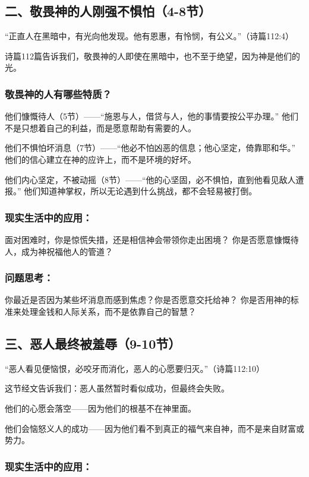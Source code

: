 \documentclass[a4paper, 12pt]{article}
\begin{document}
\subsection*{二、敬畏神的人刚强不惧怕（4-8节）}
“正直人在黑暗中，有光向他发现。他有恩惠，有怜悯，有公义。”（诗篇112:4）

诗篇112篇告诉我们，敬畏神的人即使在黑暗中，也不至于绝望，因为神是他们的光。

\subsubsection*{敬畏神的人有哪些特质？}

\hspace{0.6cm}他们慷慨待人（5节）——“施恩与人，借贷与人，他的事情要按公平办理。”
他们不是只想着自己的利益，而是愿意帮助有需要的人。

他们不惧怕坏消息（7节）——“他必不怕凶恶的信息；他心坚定，倚靠耶和华。”
他们的信心建立在神的应许上，而不是环境的好坏。

他们内心坚定，不被动摇（8节）——“他的心坚固，必不惧怕，直到他看见敌人遭报。”
他们知道神掌权，所以无论遇到什么挑战，都不会轻易被打倒。

\subsubsection*{现实生活中的应用：}

面对困难时，你是惊慌失措，还是相信神会带领你走出困境？
你是否愿意慷慨待人，成为神祝福他人的管道？
\subsubsection*{问题思考：}

你最近是否因为某些坏消息而感到焦虑？你是否愿意交托给神？
你是否用神的标准来处理金钱和人际关系，而不是依靠自己的智慧？
\subsection*{三、恶人最终被羞辱（9-10节）}
“恶人看见便恼恨，必咬牙而消化，恶人的心愿要归灭。”（诗篇112:10）

这节经文告诉我们：恶人虽然暂时看似成功，但最终会失败。

他们的心愿会落空——因为他们的根基不在神里面。

他们会恼怒义人的成功——因为他们看不到真正的福气来自神，而不是来自财富或势力。
\subsubsection*{现实生活中的应用：}
\end{document}
